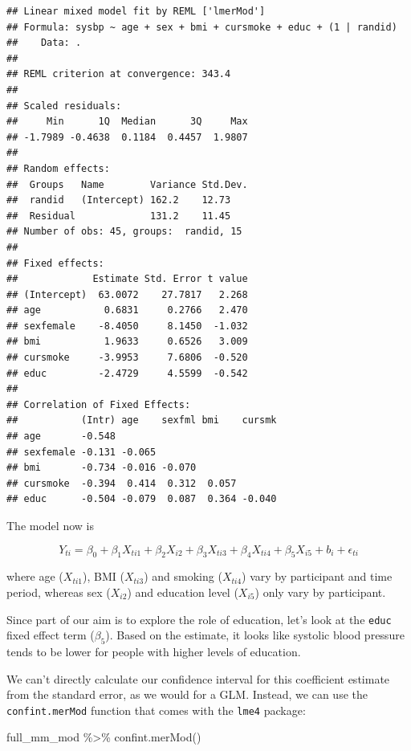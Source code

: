 \documentclass[
]{book}
\newenvironment{Shaded}{\begin{snugshade}}{\end{snugshade}}
\newcommand{\FunctionTok}[1]{\textcolor[rgb]{0.00,0.00,0.00}{#1}}
\newcommand{\NormalTok}[1]{#1}
\newcommand{\SpecialCharTok}[1]{\textcolor[rgb]{0.00,0.00,0.00}{#1}}
\begin{document}
\begin{verbatim}
## Linear mixed model fit by REML ['lmerMod']
## Formula: sysbp ~ age + sex + bmi + cursmoke + educ + (1 | randid)
##    Data: .
## 
## REML criterion at convergence: 343.4
## 
## Scaled residuals: 
##     Min      1Q  Median      3Q     Max 
## -1.7989 -0.4638  0.1184  0.4457  1.9807 
## 
## Random effects:
##  Groups   Name        Variance Std.Dev.
##  randid   (Intercept) 162.2    12.73   
##  Residual             131.2    11.45   
## Number of obs: 45, groups:  randid, 15
## 
## Fixed effects:
##             Estimate Std. Error t value
## (Intercept)  63.0072    27.7817   2.268
## age           0.6831     0.2766   2.470
## sexfemale    -8.4050     8.1450  -1.032
## bmi           1.9633     0.6526   3.009
## cursmoke     -3.9953     7.6806  -0.520
## educ         -2.4729     4.5599  -0.542
## 
## Correlation of Fixed Effects:
##           (Intr) age    sexfml bmi    cursmk
## age       -0.548                            
## sexfemale -0.131 -0.065                     
## bmi       -0.734 -0.016 -0.070              
## cursmoke  -0.394  0.414  0.312  0.057       
## educ      -0.504 -0.079  0.087  0.364 -0.040
\end{verbatim}

The model now is

\[
Y_{ti} = \beta_{0} + \beta_{1}X_{ti1} + \beta_{2}X_{i2} + \beta_{3}X_{ti3} + \beta_{4}X_{ti4} + \beta_{5}X_{i5} + b_{i} + \epsilon_{ti}
\]

where age (\(X_{ti1}\)), BMI (\(X_{ti3}\)) and smoking (\(X_{ti4}\)) vary by participant
and time period, whereas sex (\(X_{i2}\)) and education level (\(X_{i5}\)) only vary by
participant.

Since part of our aim is to explore the role of education, let's look at the
\texttt{educ} fixed effect term (\(\beta_{5}\)). Based on the estimate, it looks like systolic blood
pressure tends to be lower for people with higher levels of education.

We can't directly calculate our confidence interval for this coefficient estimate
from the standard error, as we would for a GLM. Instead, we can use the
\texttt{confint.merMod} function that comes with the \texttt{lme4} package:

\begin{Shaded}
\begin{Highlighting}[]
\NormalTok{full\_mm\_mod }\SpecialCharTok{\%\textgreater{}\%} 
  \FunctionTok{confint.merMod}\NormalTok{()}
\end{Highlighting}
\end{Shaded}
\end{document}
